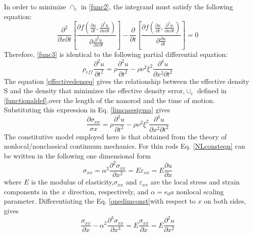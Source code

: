 In order to minimize $\cap_e$ in \eqref{func2}, the integrand must satisfy the following equation:\\
\begin{equation}
\dfrac{\partial^2}{\partial x \partial t} 
\left[
 \dfrac{\partial f \left(\frac{\partial u}{\partial t},\frac{\partial^2 u}{\partial x \partial t}  \right)}{\partial \frac{\partial^2 u}{\partial x \partial t}}  
\right] 
- 
\dfrac{\partial}{\partial t}
\left[ 
\dfrac{\partial f \left(\frac{\partial u}{\partial t},\frac{\partial^2 u}{\partial x \partial t}  \right)}{\partial \frac{\partial u}{\partial t}}  
\right] = 0
\label{func3}
\end{equation}
Therefore, \eqref{func3} is identical to the following partial differential equation:\\
\begin{equation}
\rho_{eff} \frac{\partial^2 u}{\partial t^2} = \rho \frac{\partial^2 u}{\partial t^2} - \rho \nu^2 \xi^2 \frac{\partial^4 u}{\partial x^2 \partial t^2}
\label{effectivedenseq}
\end{equation}
The equation \eqref{effectivedenseq} gives the relationship between the effective density
S
and the density that minimizes the effective density error,$\cup_e$ defined in \eqref{functionaldef},over the length of the nanorod and the time of
motion. Substituting this expression in Eq. \eqref{limcasesigma} gives\\
\begin{equation}
\dfrac{\partial \sigma_{xx}}{\sigma x} = \rho \dfrac{\partial^2 u}{\partial t^2} - \rho \nu^2 \xi^2 \dfrac{\partial^4 u}{\partial x^2 \partial t^2}
\end{equation}
The constitutive model employed here is that obtained from the
theory of nonlocal/nonclassical continuum mechanics. For thin
rods Eq. \eqref{NLconsteqn} can be written in the following one dimensional form\\
\begin{equation}
\sigma_{xx} = \alpha^2 \frac{\partial^2 \sigma_{xx}}{\partial x^2} = E \varepsilon_{xx} = E \frac{\partial u}{\partial x}
\label{onedimconst}
\end{equation}
where $E$ is the modulus of elasticity,$\sigma_{xx}$ and $\varepsilon_{xx}$ are the local stress
and strain components in the $x$ direction, respectively, and $\alpha=e_0 a$ nonlocal scaling parameter. Differentiating the Eq. \eqref{onedimconst}with respect to $x$ on both sides, gives\\
\begin{equation}
\frac{\sigma_{xx}}{\partial x} - \alpha^2 \frac{\partial^3 \sigma_{xx}}{\partial x^3} = E \frac{\sigma_{xx}}{\partial x} = E \frac{\partial^2 u}{\partial x^2}
\label{diffonedimconst}
\end{equation}
